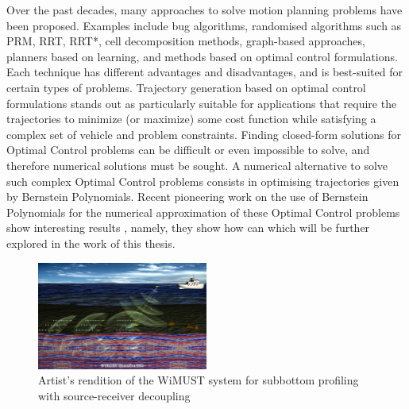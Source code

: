 \par Over the past decades, many approaches to solve motion planning problems have been proposed. Examples include bug algorithms, randomised algorithms such as PRM, RRT, RRT*, cell decomposition methods, graph-based approaches, planners based on learning, and methods based on optimal control formulations. Each technique has different advantages and disadvantages, and is best-suited for certain types of problems. Trajectory generation based on optimal control formulations stands out as particularly suitable for applications that require the trajectories to minimize (or maximize) some cost function while satisfying a complex set of vehicle and problem constraints. Finding closed-form solutions for Optimal Control problems can be difficult or even impossible to solve, and therefore numerical solutions must be sought. A numerical alternative to solve such complex Optimal Control problems consists in optimising trajectories given by Bernstein Polynomials.  Recent pioneering work on the use of Bernstein Polynomials \cite{lorentz2013bernstein} for the numerical approximation of these Optimal Control problems show interesting results \cite{cichella2018bernstein}, namely, they show how can  which will be further explored in the work of this thesis.

\begin{figure}[h!]
    \centering
    \includegraphics[width=0.5\textwidth]{Images/projects/WiMUST_project.jpg}
    \caption{Artist’s rendition of the WiMUST system for subbottom profiling with source-receiver decoupling}
    \label{fig:WiMUST_System}
\end{figure}

